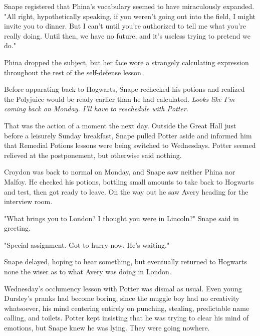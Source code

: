 \documentclass[a4paper,11pt]{article}
\begin{document}
Snape registered that Phina's vocabulary seemed to have miraculously expanded. "All right, hypothetically speaking, if you weren't going out into the field, I might invite you to dinner. But I can't until you're authorized to tell me what you're really doing. Until then, we have no future, and it's useless trying to pretend we do."

Phina dropped the subject, but her face wore a strangely calculating expression throughout the rest of the self-defense lesson.

Before apparating back to Hogwarts, Snape rechecked his potions and realized the Polyjuice would be ready earlier than he had calculated. \emph{Looks like I'm coming back on Monday. I'll have to reschedule with Potter.}

That was the action of a moment the next day. Outside the Great Hall just before a leisurely Sunday breakfast, Snape pulled Potter aside and informed him that Remedial Potions lessons were being switched to Wednesdays. Potter seemed relieved at the postponement, but otherwise said nothing.

Croydon was back to normal on Monday, and Snape saw neither Phina nor Malfoy. He checked his potions, bottling small amounts to take back to Hogwarts and test, then got ready to leave. On the way out he saw Avery heading for the interview room.

"What brings you to London? I thought you were in Lincoln?" Snape said in greeting.

"Special assignment. Got to hurry now. He's waiting."

Snape delayed, hoping to hear something, but eventually returned to Hogwarts none the wiser as to what Avery was doing in London.

Wednesday's occlumency lesson with Potter was dismal as usual. Even young Dursley's pranks had become boring, since the muggle boy had no creativity whatsoever, his mind centering entirely on punching, stealing, predictable name calling, and toilets. Potter kept insisting that he was trying to clear his mind of emotions, but Snape knew he was lying. They were going nowhere.
\end{document}
